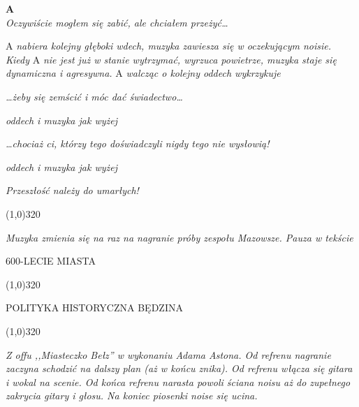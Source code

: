 \documentclass[11pt,a4paper,oneside]{article}
\begin{document}
\textbf{A}\\
\emph{Oczywiście mogłem się zabić, ale chciałem przeżyć\dots{}} 

{\color{light-gray} A \emph{nabiera kolejny głęboki wdech, muzyka zawiesza się w oczekującym noisie. Kiedy} A \emph{nie jest już w stanie wytrzymać, wyrzuca powietrze, muzyka staje się dynamiczna i agresywna.} A \emph{walcząc o kolejny oddech wykrzykuje}}

\emph{\dots{}żeby się zemścić i móc dać świadectwo\dots{}}

{\color{light-gray} \emph{oddech i muzyka jak wyżej}}

\emph{\dots{}chociaż ci, którzy tego doświadczyli nigdy tego nie wysłowią!}

{\color{light-gray} \emph{oddech i muzyka jak wyżej}}

\emph{Przeszłość należy do umarłych!}

\line(1,0){320}

{\color{light-gray} \emph{Muzyka zmienia się na raz na nagranie próby zespołu Mazowsze. Pauza w tekście}}


{\color{red}
600-LECIE MIASTA
}

\line(1,0){320}

{\color{red}
POLITYKA HISTORYCZNA BĘDZINA
}

\line(1,0){320}

{\color{light-gray} \emph{Z offu ,,Miasteczko Bełz'' w wykonaniu Adama Astona. Od refrenu nagranie zaczyna schodzić na dalszy plan (aż w końcu znika). Od refrenu włącza się gitara i wokal na scenie. Od końca refrenu narasta powoli ściana noisu aż do zupełnego zakrycia gitary i głosu. Na koniec piosenki noise się ucina.}}
\end{document}
